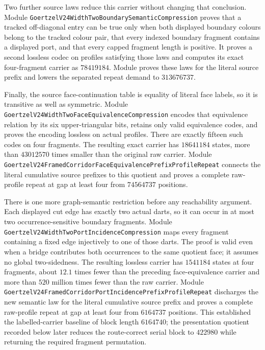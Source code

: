 \documentclass[11pt]{article}
\theoremstyle{definition}
\begin{document}
Two further source laws reduce this carrier without changing that conclusion.
Module
\texttt{GoertzelV24WidthTwoBoundarySemanticCompression} proves that a tracked
off-diagonal entry can be true only when both displayed boundary colours belong
to the tracked colour pair, that every indexed boundary fragment contains a
displayed port, and that every capped fragment length is positive.  It proves a
second lossless codec on profiles satisfying those laws and computes its exact
four-fragment carrier as $78419184$.  Module
 proves
these laws for the literal source prefix and lowers the separated repeat demand
to $313676737$.

Finally, the source face-continuation table is equality of literal face labels,
so it is transitive as well as symmetric.  Module
\texttt{GoertzelV24WidthTwoFaceEquivalenceCompression} encodes that equivalence
relation by its six upper-triangular bits, retains only valid equivalence codes,
and proves the encoding lossless on actual profiles.  There are exactly fifteen
such codes on four fragments.  The resulting exact carrier has $18641184$
states, more than $43012570$ times smaller than the original raw carrier.
Module
\texttt{GoertzelV24FramedCorridorFaceEquivalencePrefixProfileRepeat} connects
the literal cumulative source prefixes to this quotient and proves a complete
raw-profile repeat at gap at least four from $74564737$ positions.

There is one more graph-semantic restriction before any reachability
argument.  Each displayed cut edge has exactly two actual darts, so it can
occur in at most two occurrence-sensitive boundary fragments.  Module
\texttt{GoertzelV24WidthTwoPortIncidenceCompression} maps every fragment
containing a fixed edge injectively to one of those darts.  The proof is valid
even when a bridge contributes both occurrences to the same quotient face;
it assumes no global two-sidedness.  The resulting lossless carrier has
$1541184$ states at four fragments, about $12.1$ times fewer than the preceding
face-equivalence carrier and more than $520$ million times fewer than the raw
carrier.  Module
\texttt{GoertzelV24FramedCorridorPortIncidencePrefixProfileRepeat} discharges
the new semantic law for the literal cumulative source prefix and proves a
complete raw-profile repeat at gap at least four from $6164737$ positions.
This established the labelled-carrier baseline of block length $6164740$;
the presentation quotient recorded below later reduces the route-correct
serial block to $422980$ while returning the required fragment permutation.
\end{document}
